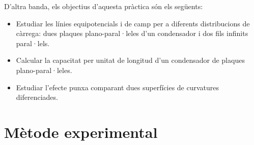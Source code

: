 D'altra banda, els objectius d'aquesta pràctica són els següents:
\begin{itemize}
	\item Estudiar les línies equipotencials i de camp per a diferents distribucions de càrrega: dues plaques plano-paral·leles d'un condensador i dos fils infinits paral·lels.
	\item Calcular la capacitat per unitat de longitud d'un condensador de plaques plano-paral·leles.
	\item Estudiar l'efecte punxa comparant dues superfícies de curvatures diferenciades.
\end{itemize}
\section{Mètode experimental}

